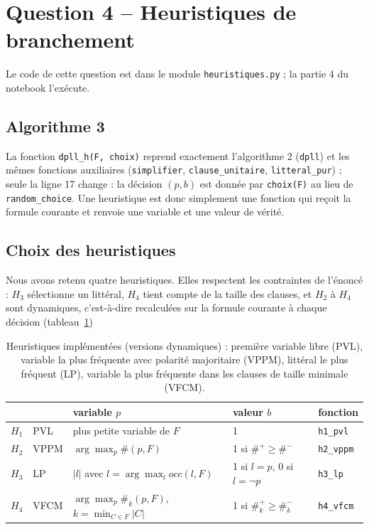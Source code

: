 \documentclass[11pt,a4paper]{article}
\begin{document}
\section{Question 4 -- Heuristiques de branchement}

Le code de cette question est dans le module \texttt{heuristiques.py} ; la partie 4 du notebook
l'exécute.

\subsection{Algorithme 3}

La fonction \texttt{dpll\_h(F, choix)} reprend exactement l'algorithme 2 (\texttt{dpll}) et les
mêmes fonctions auxiliaires (\texttt{simplifier}, \texttt{clause\_unitaire},
\texttt{litteral\_pur}) ; seule la ligne 17 change : la décision $(p,b)$ est donnée par
\texttt{choix(F)} au lieu de \texttt{random\_choice}. Une heuristique est donc simplement une
fonction qui reçoit la formule courante et renvoie une variable et une valeur de vérité.

\subsection{Choix des heuristiques}

Nous avons retenu quatre heuristiques. Elles respectent les contraintes de l'énoncé : $H_3$ sélectionne un littéral, $H_4$ tient compte de la
taille des clauses, et $H_2$ à $H_4$ sont dynamiques, c'est-à-dire recalculées sur la formule courante à chaque décision (tableau~\ref{tab:heur})

\begin{table}[h]
  \centering\small
  \begin{tabular}{lllll}
    \toprule
    & & variable $p$ & valeur $b$ & fonction\\
    \midrule
    $H_1$ & PVL  & plus petite variable de $F$ & 1 & \texttt{h1\_pvl}\\
    $H_2$ & VPPM & $\arg\max_p \#(p,F)$ & 1 si $\#^+\ge\#^-$ & \texttt{h2\_vppm}\\
    $H_3$ & LP   & $|l|$ avec $l=\arg\max_l \mathit{occ}(l,F)$ & 1 si $l=p$, 0 si $l=\neg p$
          & \texttt{h3\_lp}\\
    $H_4$ & VFCM & $\arg\max_p \#_k(p,F)$, $k=\min_{C\in F}|C|$ & 1 si $\#_k^+\ge\#_k^-$
          & \texttt{h4\_vfcm}\\
    \bottomrule
  \end{tabular}
  \caption{Heuristiques implémentées (versions dynamiques) : première variable libre (PVL),
  variable la plus fréquente avec polarité majoritaire (VPPM), littéral le plus fréquent (LP),
  variable la plus fréquente dans les clauses de taille minimale (VFCM).}
  \label{tab:heur}
\end{table}
\end{document}
